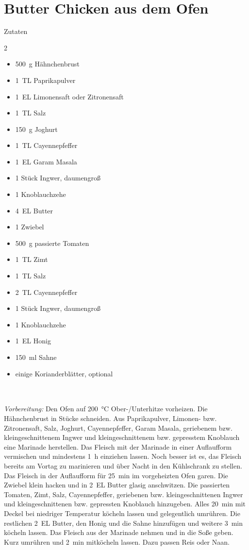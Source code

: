 \section*{Butter Chicken aus dem Ofen}
\ihead{}\ohead{}
\cfoot{}
{\Large Zutaten}
\begin{multicols}{2}
\begin{itemize}
\item \SI{500}{g} Hähnchenbrust
\item \SI{1}{TL} Paprikapulver
\item \SI{1}{EL} Limonensaft oder Zitronensaft
\item \SI{1}{TL} Salz
\item \SI{150}{g} Joghurt
\item \SI{1}{TL} Cayennepfeffer
\item \SI{1}{EL} Garam Masala
\item \num{1} Stück Ingwer, daumengroß
\item \num{1} Knoblauchzehe
\item \SI{4}{EL} Butter
\item \num{1} Zwiebel
\item \SI{500}{g} passierte Tomaten
\item \SI{1}{TL} Zimt
\item \SI{1}{TL} Salz
\item \SI{2}{TL} Cayennepfeffer
\item \num{1} Stück Ingwer, daumengroß
\item \num{1} Knoblauchzehe
\item \SI{1}{EL} Honig
\item \SI{150}{ml} Sahne
\item einige Korianderblätter, optional
\end{itemize}
\end{multicols}
\\
\\
\textit{Vorbereitung:} Den Ofen auf \SI{200}{\celsius} Ober-/Unterhitze vorheizen.
Die Hähnchenbrust in Stücke schneiden.
Aus Paprikapulver, Limonen- bzw. Zitronensaft, Salz, Joghurt, Cayennepfeffer, Garam Masala, geriebenem bzw. kleingeschnittenem Ingwer und kleingeschnittenem bzw. gepresstem Knoblauch eine Marinade herstellen.
Das Fleisch mit der Marinade in einer Auflaufform vermischen und mindestens \SI{1}{h} einziehen lassen.
Noch besser ist es, das Fleisch bereits am Vortag zu marinieren und über Nacht in den Kühlschrank zu stellen.
Das Fleisch in der Auflaufform für \SI{25}{min} im vorgeheizten Ofen garen.
Die Zwiebel klein hacken und in \SI{2}{EL} Butter glasig anschwitzen.
Die passierten Tomaten, Zimt, Salz, Cayennepfeffer, geriebenen bzw. kleingeschnittenen Ingwer und kleingeschnittenen bzw. gepressten Knoblauch hinzugeben.
Alles \SI{20}{min} mit Deckel bei niedriger Temperatur köcheln lassen und gelegentlich umrühren.
Die restlichen \SI{2}{EL} Butter, den Honig und die Sahne hinzufügen und weitere \SI{3}{min} köcheln lassen.
Das Fleisch aus der Marinade nehmen und in die Soße geben.
Kurz umrühren und \SI{2}{min} mitköcheln lassen.
Dazu passen Reis oder Naan.
